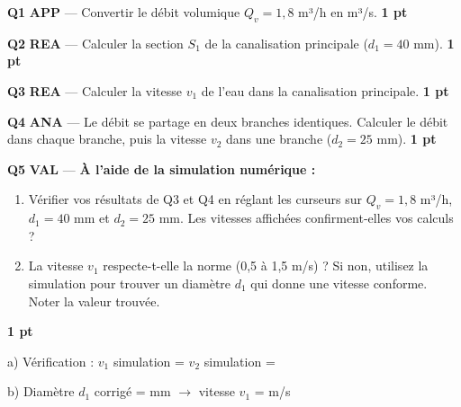 \documentclass[a4paper,11pt]{article}
\newcommand{\pts}[1]{\hfill\textcolor{gris}{\small\textbf{#1}}}
\newcommand{\comp}[1]{\colorbox{blue!10}{\scriptsize\textbf{#1}}}
\begin{document}
\textbf{Q1} \comp{APP} — Convertir le débit volumique $Q_v = 1{,}8$ m³/h en m³/s. \pts{1 pt}

\begin{reponsebox}[2.5cm]
\dotfill

\dotfill
\end{reponsebox}

\textbf{Q2} \comp{REA} — Calculer la section $S_1$ de la canalisation principale ($d_1 = 40$ mm). \pts{1 pt}

\begin{reponsebox}[3cm]
\dotfill

\dotfill

\dotfill
\end{reponsebox}

\textbf{Q3} \comp{REA} — Calculer la vitesse $v_1$ de l'eau dans la canalisation principale. \pts{1 pt}

\begin{reponsebox}[3cm]
\dotfill

\dotfill

\dotfill
\end{reponsebox}

\textbf{Q4} \comp{ANA} — Le débit se partage en deux branches identiques. Calculer le débit dans chaque branche, puis la vitesse $v_2$ dans une branche ($d_2 = 25$ mm). \pts{1 pt}

\begin{reponsebox}[4cm]
\dotfill

\dotfill

\dotfill

\dotfill

\dotfill
\end{reponsebox}

\textbf{Q5} \comp{VAL} — \textbf{À l'aide de la simulation numérique :}
\begin{enumerate}[nosep, label=\alph*)]
  \item Vérifier vos résultats de Q3 et Q4 en réglant les curseurs sur $Q_v = 1{,}8$ m³/h, $d_1 = 40$ mm et $d_2 = 25$ mm. Les vitesses affichées confirment-elles vos calculs ?
  \item La vitesse $v_1$ respecte-t-elle la norme (0,5 à 1,5 m/s) ? Si non, utilisez la simulation pour trouver un diamètre $d_1$ qui donne une vitesse conforme. Noter la valeur trouvée.
\end{enumerate}
\pts{1 pt}

\begin{reponsebox}[4cm]
a) Vérification : $v_1$ simulation = \dotfill \quad $v_2$ simulation = \dotfill

\dotfill

b) Diamètre $d_1$ corrigé = \dotfill mm \quad $\to$ vitesse $v_1$ = \dotfill m/s

\dotfill
\end{reponsebox}
\end{document}
